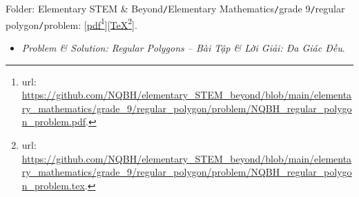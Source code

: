 \documentclass[12pt]{article}
\begin{document}
\begin{enumerate}
	Folder: {\sf Elementary STEM \& Beyond{\tt/}Elementary Mathematics{\tt/}grade 9{\tt/}regular polygon{\tt/}problem}: [\href{https://github.com/NQBH/elementary_STEM_beyond/blob/main/elementary_mathematics/grade_9/regular_polygon/problem/NQBH_regular_polygon_problem.pdf}{pdf}\footnote{{\sc url}: \url{https://github.com/NQBH/elementary_STEM_beyond/blob/main/elementary_mathematics/grade_9/regular_polygon/problem/NQBH_regular_polygon_problem.pdf}.}][\href{https://github.com/NQBH/elementary_STEM_beyond/blob/main/elementary_mathematics/grade_9/regular_polygon/problem/NQBH_regular_polygon_problem.tex}{\TeX}\footnote{{\sc url}: \url{https://github.com/NQBH/elementary_STEM_beyond/blob/main/elementary_mathematics/grade_9/regular_polygon/problem/NQBH_regular_polygon_problem.tex}.}].
	\begin{itemize}
		\item {\it Problem \& Solution: Regular Polygons -- Bài Tập \& Lời Giải: Đa Giác Đều}.
		

\end{itemize}
\end{enumerate}
\end{document}
